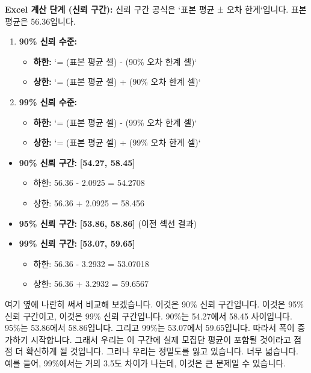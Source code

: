 \documentclass[11pt,a4paper]{article}
\begin{document}
\textbf{Excel 계산 단계 (신뢰 구간):}
신뢰 구간 공식은 `표본 평균 ± 오차 한계`입니다. 표본 평균은 56.36입니다.

\begin{enumerate}
    \item \textbf{90\% 신뢰 수준:}
        \begin{itemize}
            \item \textbf{하한:} `= (표본 평균 셀) - (90\% 오차 한계 셀)`
            \item \textbf{상한:} `= (표본 평균 셀) + (90\% 오차 한계 셀)`
        \end{itemize}
    \item \textbf{99\% 신뢰 수준:}
        \begin{itemize}
            \item \textbf{하한:} `= (표본 평균 셀) - (99\% 오차 한계 셀)`
            \item \textbf{상한:} `= (표본 평균 셀) + (99\% 오차 한계 셀)`
        \end{itemize}
\end{enumerate}
\begin{tcolorbox}[colback=mygreen!10!white, colframe=mygreen!75!black, title=계산 결과: 신뢰 수준별 신뢰 구간]
\begin{itemize}
    \item \textbf{90\% 신뢰 구간:} \textbf{[54.27, 58.45]}
        \begin{itemize}
            \item 하한: 56.36 - 2.0925 = 54.2708
            \item 상한: 56.36 + 2.0925 = 58.456
        \end{itemize}
    \item \textbf{95\% 신뢰 구간:} \textbf{[53.86, 58.86]} (이전 섹션 결과)
    \item \textbf{99\% 신뢰 구간:} \textbf{[53.07, 59.65]}
        \begin{itemize}
            \item 하한: 56.36 - 3.2932 = 53.07018
            \item 상한: 56.36 + 3.2932 = 59.6567
        \end{itemize}
\end{itemize}
\end{tcolorbox}

\begin{tcolorbox}[title=슬라이드 66: 뉴욕 일일 기온 샘플 Excel 시트 (13/13)]
여기 옆에 나란히 써서 비교해 보겠습니다. 이것은 90\% 신뢰 구간입니다. 이것은 95\% 신뢰 구간이고, 이것은 99\% 신뢰 구간입니다. 90\%는 54.27에서 58.45 사이입니다. 95\%는 53.86에서 58.86입니다. 그리고 99\%는 53.07에서 59.65입니다. 따라서 폭이 증가하기 시작합니다. 그래서 우리는 이 구간에 실제 모집단 평균이 포함될 것이라고 점점 더 확신하게 될 것입니다. 그러나 우리는 정밀도를 잃고 있습니다. 너무 넓습니다. 예를 들어, 99\%에서는 거의 3.5도 차이가 나는데, 이것은 큰 문제일 수 있습니다.
\end{tcolorbox}
\end{document}
